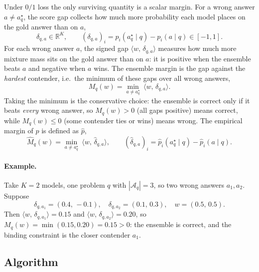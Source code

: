 \documentclass{article} %
\providecommand{\R}{\mathbb{R}}
\providecommand{\Aq}{\mathcal{A}_q}
\providecommand{\ip}[2]{\langle #1,\, #2\rangle}
\providecommand{\dhat}{\widehat{\delta}}
\providecommand{\phat}{\widehat{p}}
\providecommand{\Mhat}{\widehat{M}}
\begin{document}
Under $0/1$ loss the only surviving quantity is a scalar margin. For a wrong
answer $a\ne a_q^\star$, the score gap collects how much more probability each
model places on the gold answer than on $a$,
\begin{equation}
\label{eq:delta}
\delta_{q,a}\in\R^K,
\qquad
(\delta_{q,a})_i = p_i(a_q^\star\mid q) - p_i(a\mid q) \in [-1,1].
\end{equation}
For each wrong answer $a$, the signed gap $\ip{w}{\delta_{q,a}}$ measures how
much more mixture mass sits on the gold answer than on $a$: it is positive when
the ensemble beats $a$ and negative when $a$ wins. The ensemble margin is the
gap against the \emph{hardest} contender, i.e.\ the minimum of these gaps over
all wrong answers,
\begin{equation}
\label{eq:M}
M_q(w) = \min_{a\ne a_q^\star}\ \ip{w}{\delta_{q,a}}.
\end{equation}
Taking the minimum is the conservative choice: the ensemble is correct only if
it beats \emph{every} wrong answer, so $M_q(w)>0$ (all gaps positive) means
correct, while $M_q(w)\le 0$ (some contender ties or wins) means wrong. The empirical margin of $p$ is defined as $\phat$,
\begin{equation}
\label{eq:Mhat}
\Mhat_q(w) = \min_{a\ne a_q^\star}\ \ip{w}{\dhat_{q,a}},
\qquad
(\dhat_{q,a})_i = \phat_i(a_q^\star\mid q) - \phat_i(a\mid q).
\end{equation}

\paragraph{Example.}
Take $K=2$ models, one problem $q$ with $|\Aq|=3$, so two wrong answers
$a_1,a_2$. Suppose
\begin{equation}
\label{eq:wex1}
\delta_{q,a_1} = (0.4,\,-0.1),\quad
\delta_{q,a_2} = (0.1,\,0.3),\quad
w = (0.5,\,0.5).
\end{equation}
Then $\ip{w}{\delta_{q,a_1}} = 0.15$ and $\ip{w}{\delta_{q,a_2}} = 0.20$, so
$M_q(w) = \min(0.15,0.20) = 0.15 > 0$: the ensemble is correct, and the binding
constraint is the closer contender $a_1$.
\subsection{Algorithm}
\label{sec:method-framing}
\end{document}
